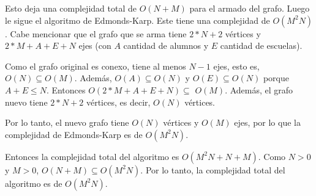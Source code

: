 Esto deja una complejidad total de $O(N+M)$ para el armado del grafo. Luego le sigue el algoritmo de Edmonds-Karp. Este tiene una complejidad de $O(M^2N)$. Cabe mencionar que el grafo que se arma tiene $2*N+2$ vértices y $2*M + A + E + N$ ejes (con $A$ cantidad de alumnos y $E$ cantidad de escuelas). 


Como el grafo original es conexo, tiene al menos $N-1$ ejes, esto es,  $O(N) \subseteq O(M)$. Además, $O(A) \subseteq O(N)$ y $O(E) \subseteq O(N)$ porque $A+E \leq N$. Entonces $O(2*M + A + E + N) \subseteq$ $O(M)$. Además, el grafo nuevo tiene $2*N+2$ vértices, es decir, $O(N)$ vértices. 

Por lo tanto, el nuevo grafo tiene $O(N)$ vértices y $O(M)$ ejes, por lo que la complejidad de Edmonds-Karp es de $O(M^2N)$.

Entonces la complejidad total del algoritmo es $O(M^2N + N + M)$. Como $N > 0$ y $M>0$, $O(N+M) \subseteq O(M^2N)$. Por lo tanto, la complejidad total del algoritmo es de $O(M^2N)$.